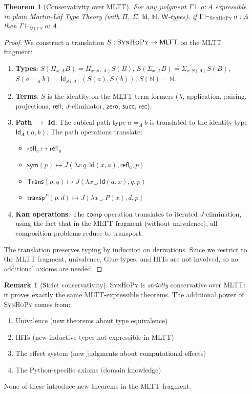 \documentclass[11pt,a4paper]{report}
\theoremstyle{definition}
\newtheorem{remark}[definition]{Remark}
\theoremstyle{plain}
\newtheorem{theorem}[definition]{Theorem}
\newcommand{\Nat}{\mathbb{N}}
\newcommand{\rec}{\mathsf{rec}}
\newcommand{\transp}{\mathsf{transp}}
\newcommand{\comp}{\mathsf{comp}}
\newcommand{\refl}{\mathsf{refl}}
\newcommand{\Refl}{\mathsf{refl}}
\newcommand{\sym}{\mathsf{sym}}
\newcommand{\Trans}{\mathsf{Trans}}
\newcommand{\synhopy}{\textsc{SynHoPy}}
\begin{document}
\begin{theorem}[Conservativity over MLTT]
\label{thm:conservativity-mltt}
For any judgment $\Gamma \vdash a : A$ expressible in plain Martin-L\"of Type
Theory (with $\Pi$, $\Sigma$, $\mathsf{Id}$, $\Nat$, $\mathsf{W}$-types),
if $\Gamma \vdash_{\synhopy} a : A$ then $\Gamma \vdash_{\mathsf{MLTT}} a : A$.
\end{theorem}
\begin{proof}
We construct a translation $S : \synhopy \to \mathsf{MLTT}$ on the MLTT
fragment:
\begin{enumerate}
  \item \textbf{Types}: $S(\Pi_{x:A}B) = \Pi_{x:S(A)} S(B)$,
    $S(\Sigma_{x:A}B) = \Sigma_{x:S(A)} S(B)$, $S(a =_A b) = \mathsf{Id}_{S(A)}(S(a), S(b))$,
    $S(\Nat) = \Nat$.
  \item \textbf{Terms}: $S$ is the identity on the MLTT term formers
    ($\lambda$, application, pairing, projections, $\Refl$, $J$-eliminator,
    $\mathsf{zero}$, $\mathsf{succ}$, $\rec$).
  \item \textbf{Path $\to$ Id}: The cubical path type $a =_A b$ is translated
    to the identity type $\mathsf{Id}_A(a, b)$.  The path operations translate:
    \begin{itemize}
      \item $\Refl_a \mapsto \refl_a$
      \item $\sym(p) \mapsto J(\lambda x\,q.\,\mathsf{Id}(x, a), \refl_a, p)$
      \item $\Trans(p, q) \mapsto J(\lambda x\,\_.\,\mathsf{Id}(a, x), q, p)$
      \item $\transp^P(p, d) \mapsto J(\lambda x\,\_.\,P(x), d, p)$
    \end{itemize}
  \item \textbf{Kan operations}: The $\comp$ operation translates to iterated
    $J$-elimination, using the fact that in the MLTT fragment (without univalence),
    all composition problems reduce to transport.
\end{enumerate}
The translation preserves typing by induction on derivations.  Since we
restrict to the MLTT fragment, univalence, Glue types, and HITs are not
involved, so no additional axioms are needed.
\end{proof}

\begin{remark}[Strict conservativity]
\synhopy{} is \emph{strictly} conservative over MLTT: it proves exactly the
same MLTT-expressible theorems.  The additional power of \synhopy{} comes from:
\begin{enumerate}
  \item Univalence (new theorems about type equivalence)
  \item HITs (new inductive types not expressible in MLTT)
  \item The effect system (new judgments about computational effects)
  \item The Python-specific axioms (domain knowledge)
\end{enumerate}
None of these introduce new theorems in the MLTT fragment.
\end{remark}
\end{document}
